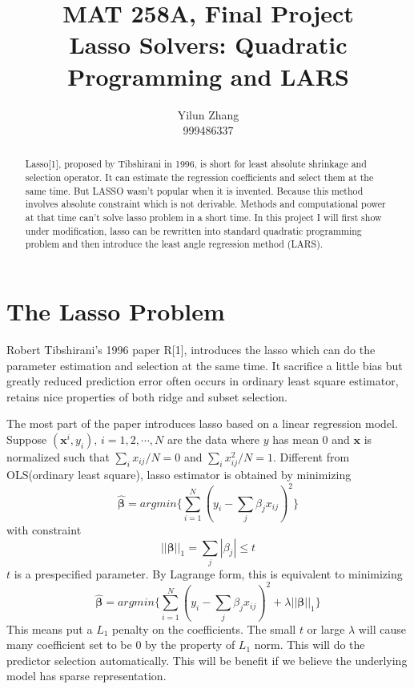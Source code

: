 \documentclass{article} %
\title{MAT 258A, Final Project\\
	\small Lasso Solvers: Quadratic Programming and LARS}
\author{Yilun Zhang\\
	999486337}
\begin{document}
\maketitle

\begin{abstract}
Lasso[1], proposed by Tibshirani in 1996, is short for least absolute shrinkage and selection operator.  It can estimate the regression coefficients and select them at the same time. But LASSO wasn't popular when it is invented. Because this method involves absolute constraint which is not derivable. Methods and computational power at that time can't solve lasso problem in a short time. In this project I will first show under modification, lasso can be rewritten into standard quadratic programming problem and then introduce the least angle regression method (LARS).

\end{abstract}

\section{The Lasso Problem\label{sec1}}

Robert Tibshirani's 1996 paper R[1], introduces the lasso which can do the parameter estimation and selection at the same time. It sacrifice a little bias but greatly reduced prediction error often occurs in ordinary least square estimator, retains nice properties of both ridge and subset selection. 

The most part of the paper introduces lasso based on a linear regression model. Suppose $(\bm{x}^i,y_i),\,i=1,2,\cdots,N$ are the data where $y$ has mean 0 and $\bm{x}$ is normalized such that $\sum_ix_{ij}/N=0$ and $\sum_ix^2_{ij}/N=1$. Different from OLS(ordinary least square), lasso estimator is obtained by minimizing
\begin{equation}
\hat{\bm{\beta}}=arg min \{\sum_{i=1}^{N}(y_i-\sum_j\beta_jx_{ij})^2\}\label{eq1}
\end{equation}
with constraint\begin{equation}
||\bm{\beta}||_1=\sum_j|\beta_j|\le t\label{eq2}
\end{equation}
$t$ is a prespecified parameter.
By Lagrange form, this is equivalent to minimizing
\begin{equation}
\hat{\bm{\beta}}=arg min \{\sum_{i=1}^{N}(y_i-\sum_j\beta_jx_{ij})^2+\lambda||\bm{\beta}||_1\}\label{eq3}
\end{equation}
This means put a $L_1$ penalty on the coefficients. The small $t$ or large $\lambda$ will cause many coefficient set to be 0 by the property of $L_1$ norm. This will do the predictor selection automatically. This will be benefit if we believe the underlying model has sparse representation.
\end{document}
